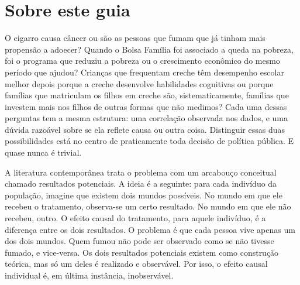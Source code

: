 \documentclass[12pt, a4paper, openany]{book}
\numberwithin{equation}{chapter}
\numberwithin{table}{chapter}
\numberwithin{figure}{chapter}
\begin{document}
\vfill


\newpage

\thispagestyle{empty}
\section*{Sobre este guia}
O cigarro causa câncer ou são as pessoas que fumam que já tinham mais
propensão a adoecer? Quando o Bolsa Família foi associado a queda na
pobreza, foi o programa que reduziu a pobreza ou o crescimento econômico
do mesmo período que ajudou? Crianças que frequentam creche têm
desempenho escolar melhor depois porque a creche desenvolve habilidades
cognitivas ou porque famílias que matriculam os filhos em creche são,
sistematicamente, famílias que investem mais nos filhos de outras formas
que não medimos? Cada uma dessas perguntas tem a mesma estrutura: uma
correlação observada nos dados, e uma dúvida razoável sobre se ela
reflete causa ou outra coisa. Distinguir essas duas possibilidades está no
centro de praticamente toda decisão de política pública. E quase nunca é
trivial.

A literatura contemporânea trata o problema com um arcabouço conceitual
chamado resultados potenciais. A ideia é a seguinte: para cada indivíduo
da população, imagine que existem dois mundos possíveis. No mundo em que
ele recebeu o tratamento, observa-se um certo resultado. No mundo em que
ele não recebeu, outro. O efeito causal do tratamento, para aquele
indivíduo, é a diferença entre os dois resultados. O problema é que cada
pessoa vive apenas um dos dois mundos. Quem fumou não pode ser observado
como se não tivesse fumado, e vice-versa. Os dois resultados potenciais
existem como construção teórica, mas só um deles é realizado e
observável. Por isso, o efeito causal individual é, em última instância,
inobservável.
\end{document}

